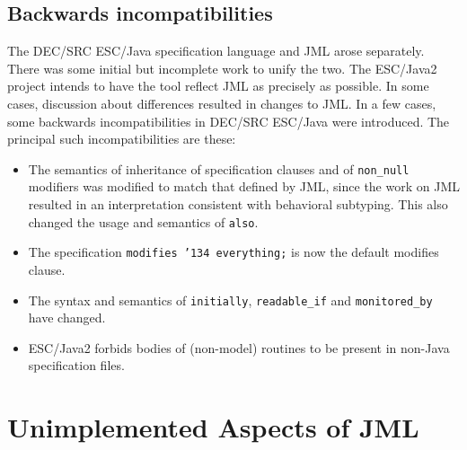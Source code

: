 \documentclass{acm_proc_article-sp}
\begin{document}
\subsection{Backwards incompatibilities}
The DEC/SRC ESC/Java specification language and JML arose separately.  There
was some initial but incomplete work to unify the two.  The ESC/Java2
project intends to have the tool reflect JML as precisely as possible.
In some cases, discussion about differences resulted in changes to JML.  In
a few cases, some backwards incompatibilities in DEC/SRC ESC/Java were
introduced.  The principal such incompatibilities are these:
\setlength{\partopsep}{0in}\setlength{\parskip}{0in}\setlength{\itemsep}{0in}\setlength{\topsep}{0in}
\begin{itemize}
\setlength{\partopsep}{0in}\setlength{\parskip}{0in}\setlength{\itemsep}{0in}\setlength{\topsep}{0in}
\item The semantics of inheritance of specification clauses and of
  \texttt{non\_null} modifiers was modified to match that defined by
  JML, since the work on JML resulted in an interpretation consistent
  with behavioral subtyping.  This also changed the usage and
  semantics of \texttt{also}.
\item The specification \texttt{modifies \char'134 everything;} is now the default
  modifies clause.
\item The syntax and semantics of \texttt{initially}, \texttt{readable\_if} 
 and \texttt{monitored\_by} have changed.
\item ESC/Java2 forbids bodies of (non-model) routines to be present
  in non-Java specification files.
\end{itemize}

\section{Unimplemented Aspects of JML}
\end{document}
